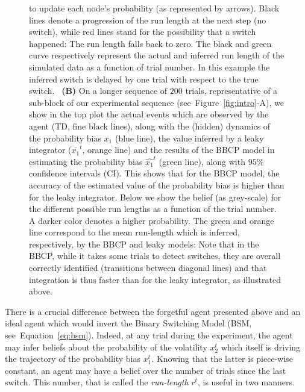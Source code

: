 \documentclass[12pt,english]{article}%
\newcommand{\seeFig}[1]{Figure~\ref{fig:#1}}
\newcommand{\seeEq}[1]{Equation~\ref{eq:#1}}
\newcommand{\AM}[1]{\textbf{\textcolor{blue}{[AM: #1]}}}
\begin{document}
\begin{figure}
{to update each node's probability (as represented by arrows).
Black lines denote a progression of the run length at the next step (no switch),
while red lines stand for the possibility that a switch happened:
The run length falls back to zero.
The black and green curve respectively represent
the actual and inferred run length of the simulated data
as a function of trial number.
In this example the inferred switch is delayed
by one trial with respect to the true switch.
~\textbf{(B)} On a longer sequence of $200$ trials,
representative of a sub-block of our experimental sequence (see~\seeFig{intro}-A), %
we show in the top plot
the actual events which are observed by the agent (TD, fine black lines),
along with the (hidden) dynamics of the probability bias $x_1$ (blue line),
the value inferred by a leaky integrator ($\bar{x_1}^t$, orange line)
and the results of the BBCP model
in estimating the probability bias $\hat{x_1}^t$ (green line),
along with $95\%$ confidence intervals (CI).
This shows that for the BBCP model,
the accuracy of the estimated value of the probability bias
is higher than for the leaky integrator.
Below we show the belief (as grey-scale) for the different possible run lengths
as a function of the trial number.
A darker color denotes a higher probability.
The green and orange line correspond to the mean run-length which is inferred,
respectively, by the BBCP and leaky models:
Note that in the BBCP, while it takes some trials to detect switches,
they are overall correctly identified (transitions between diagonal lines) and
that integration is thus faster than for the leaky integrator, as illustrated above.
}
\label{fig:bayesianchangepoint}
\end{figure}
There is a crucial difference between the forgetful agent presented above
and an ideal agent which would invert the Binary Switching Model (BSM, see~\seeEq{bsm}).
Indeed, at any trial during the experiment,
the agent may infer beliefs about the probability of the volatility $x_2^t$
which itself is driving the trajectory of the probability bias $x_1^t$.
Knowing that the latter is piece-wise constant,
an agent may have a belief over the number of trials since the last switch.
This number, that is called the \emph{run-length} $r^t$, is useful in two manners.
\end{document}
